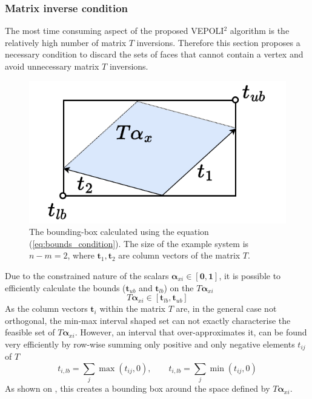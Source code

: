 \subsubsection{Matrix inverse condition} 

The most time consuming aspect of the proposed VEPOLI$^2$ algorithm is the relatively high number of matrix $T$ inversions. Therefore this section proposes a necessary condition to discard the sets of faces that cannot contain a vertex and avoid unnecessary matrix $T$ inversions.

\begin{figure}
    \centering
    \includegraphics[width=\linewidth]{Papers/images/matrix_condition.pdf}
    \caption{The bounding-box calculated using the equation (\ref{eq:bounds_condition}). The size of the example system is $n\!-\!m\!=\!2$, where $\bm{t}_1,\bm{t}_2$ are column vectors of the matrix $T$.}
    \label{fig:matrix_condition}
\end{figure}
Due to the constrained nature of the scalars $\bm{\alpha}_{xi}\in[\bm{0},\bm{1}]$, it is possible to efficiently calculate the bounds (${\bm{t}_{ub}}$ and $\bm{t}_{lb}$) on the $T\bm{\alpha}_{xi}$ 
\begin{equation}
    T\bm{\alpha}_{xi}  \in [\bm{t}_{lb}, \bm{t}_{ub}]\label{eq:necesassry_condition1}
\end{equation}
As the column vectors $\bm{t}_i$ within the matrix $T$ are, in the general case not orthogonal, the min-max interval shaped set can not exactly characterise the feasible set of $T\bm{\alpha}_{xi}$. However, an interval that over-approximates it, can be found very efficiently by row-wise summing only positive and only negative elements $t_{ij}$ of  $T$
\begin{equation}
t_{i,lb} = \sum_j \max(t_{ij}, 0), \qquad
t_{i,lb} = \sum_j \min(t_{ij}, 0) 
\label{eq:bounds_condition}
\end{equation}
As shown on , this creates a bounding box around the space defined by  $T\bm{\alpha}_{xi}$.

